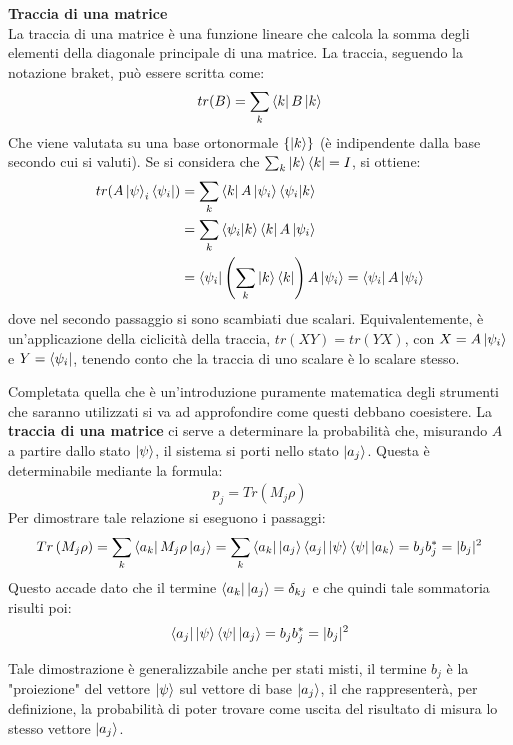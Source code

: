 \begin{info}
\textbf{Traccia di una matrice}\\
La traccia di una matrice è una funzione lineare che calcola la somma degli elementi della diagonale principale di una matrice. La traccia, seguendo la notazione braket, può essere scritta come:
\begin{gather*}
tr(B) = \sum_{k} \bra{k} B \ket{k}
\end{gather*}
Che viene valutata su una base ortonormale \(\{\ket{k}\}\) (è indipendente dalla base secondo cui si valuti).
Se si considera che \(\sum_{k}\ket{k}\bra{k} = I\), si ottiene:
\begin{align*}
tr(A\ket{\psi}_i \bra{\psi_i}) &= \sum_{k}\bra{k}A\ket{\psi_i}\braket{\psi_i | k}\\
       &= \sum_{k} \braket{\psi_i | k}\bra{k}A\ket{\psi_i}\\
       &=\bra{\psi_i}\left(\sum_{k} \ket{k}\bra{k}\right) A \ket{\psi_i} = \bra{\psi_i} A \ket{\psi_i}
\end{align*}
dove nel secondo passaggio si sono scambiati due scalari. Equivalentemente, è un’applicazione della ciclicità della traccia, \(tr(XY ) = tr(Y X)\), con \(X = A \ket{\psi_i}\) e \(Y = \bra{\psi_i}\), tenendo conto che la traccia di uno scalare è lo scalare stesso.
\end{info}
Completata quella che è un'introduzione puramente matematica degli strumenti che saranno utilizzati si va ad approfondire come questi debbano coesistere. La \textbf{traccia di una matrice} ci serve a determinare la probabilità che, misurando \(A\) a partire dallo stato \(\ket{\psi}\), il sistema si porti nello stato \(\ket{a_j}\). Questa è determinabile mediante la formula:
\begin{gather*}
p_j = Tr\left(M_j \rho\right)
\end{gather*}
Per dimostrare tale relazione si eseguono i passaggi:
\begin{gather*}
Tr\left(M_j \rho\right) = \sum_{k}\bra{a_k}M_j \rho \ket{a_j} = \sum_{k}\bra{a_k}\ket{a_j}\bra{a_j}\ket{\psi}\bra{\psi}\ket{a_k} = b_j b_j^* = |b_j|^2
\end{gather*} 
Questo accade dato che il termine \(\bra{a_k}\ket{a_j} = \delta_{kj}\) e che quindi tale sommatoria risulti poi:
\begin{gather*}
\bra{a_j}\ket{\psi}\bra{\psi}\ket{a_j} = b_j b_j^* = |b_j|^2
\end{gather*}

Tale dimostrazione è generalizzabile anche per stati misti, il termine \(b_j\) è la "proiezione" del vettore \(\ket{\psi}\) sul vettore di base \(\ket{a_j}\), il che rappresenterà, per definizione, la probabilità di poter trovare come uscita del risultato di misura lo stesso vettore \(\ket{a_j}\). 

